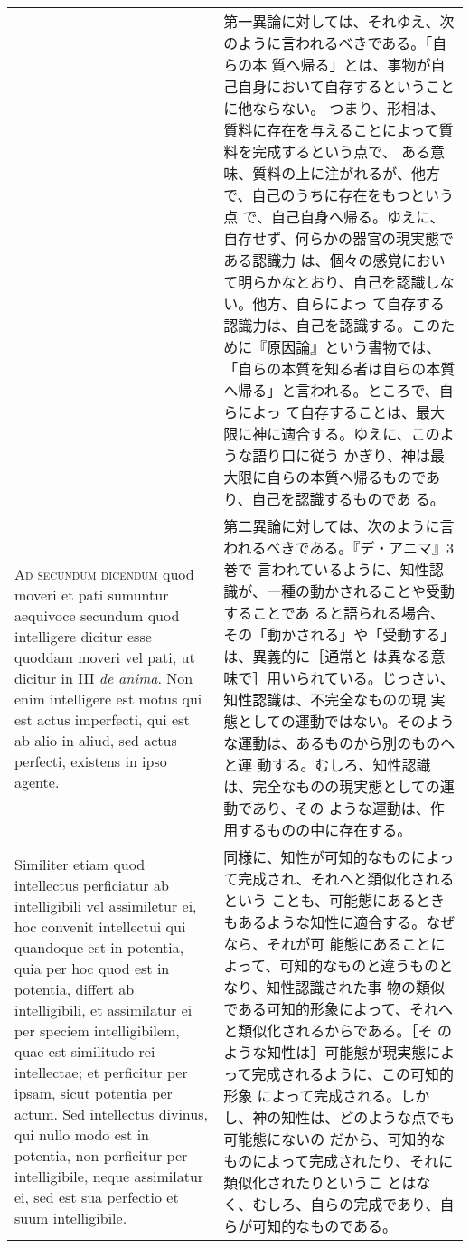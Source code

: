 \documentclass[10pt]{jsarticle} %
\begin{document}
\begin{longtable}{p{21em}p{21em}}
&


第一異論に対しては、それゆえ、次のように言われるべきである。「自らの本
質へ帰る」とは、事物が自己自身において自存するということに他ならない。
つまり、形相は、質料に存在を与えることによって質料を完成するという点で、
ある意味、質料の上に注がれるが、他方で、自己のうちに存在をもつという点
で、自己自身へ帰る。ゆえに、自存せず、何らかの器官の現実態である認識力
は、個々の感覚において明らかなとおり、自己を認識しない。他方、自らによっ
て自存する認識力は、自己を認識する。このために『原因論』という書物では、
「自らの本質を知る者は自らの本質へ帰る」と言われる。ところで、自らによっ
て自存することは、最大限に神に適合する。ゆえに、このような語り口に従う
かぎり、神は最大限に自らの本質へ帰るものであり、自己を認識するものであ
る。

\\


{\scshape Ad secundum dicendum} quod moveri et pati sumuntur aequivoce
secundum quod intelligere dicitur esse quoddam moveri vel pati, ut
dicitur in III {\itshape de anima}. Non enim intelligere est motus qui
est actus imperfecti, qui est ab alio in aliud, sed actus perfecti,
existens in ipso agente.

&

第二異論に対しては、次のように言われるべきである。『デ・アニマ』3巻で
言われているように、知性認識が、一種の動かされることや受動することであ
ると語られる場合、その「動かされる」や「受動する」は、異義的に［通常と
は異なる意味で］用いられている。じっさい、知性認識は、不完全なものの現
実態としての運動ではない。そのような運動は、あるものから別のものへと運
動する。むしろ、知性認識は、完全なものの現実態としての運動であり、その
ような運動は、作用するものの中に存在する。


\\

Similiter etiam quod intellectus perficiatur ab intelligibili vel
assimiletur ei, hoc convenit intellectui qui quandoque est in
potentia, quia per hoc quod est in potentia, differt ab intelligibili,
et assimilatur ei per speciem intelligibilem, quae est similitudo rei
intellectae; et perficitur per ipsam, sicut potentia per actum. Sed
intellectus divinus, qui nullo modo est in potentia, non perficitur
per intelligibile, neque assimilatur ei, sed est sua perfectio et suum
intelligibile.


&


同様に、知性が可知的なものによって完成され、それへと類似化されるという
ことも、可能態にあるときもあるような知性に適合する。なぜなら、それが可
能態にあることによって、可知的なものと違うものとなり、知性認識された事
物の類似である可知的形象によって、それへと類似化されるからである。［そ
のような知性は］可能態が現実態によって完成されるように、この可知的形象
によって完成される。しかし、神の知性は、どのような点でも可能態にないの
だから、可知的なものによって完成されたり、それに類似化されたりというこ
とはなく、むしろ、自らの完成であり、自らが可知的なものである。



\end{longtable}
\end{document}
